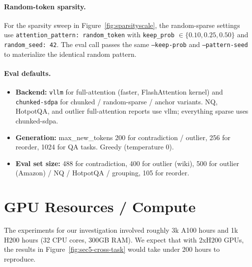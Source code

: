 \paragraph{Random-token sparsity.}
For the sparsity sweep in Figure~\ref{fig:sparsityscale}, the random-sparse settings use \texttt{attention\_pattern: random\_token} with \texttt{keep\_prob} $\in \{0.10, 0.25, 0.50\}$ and \texttt{random\_seed: 42}. The eval call passes the same \texttt{--keep-prob} and \texttt{--pattern-seed} to materialize the identical random pattern.

\paragraph{Eval defaults.}
\begin{itemize}
\item \textbf{Backend:} \texttt{vllm} \cite{kwon2023efficient} for full-attention (faster, FlashAttention \cite{dao2023flashattention2}  kernel) and \texttt{chunked-sdpa} for chunked / random-sparse / anchor variants. NQ, HotpotQA, and outlier full-attention reports use vllm; everything sparse uses chunked-sdpa.
\item \textbf{Generation:} max\_new\_tokens 200 for contradiction / outlier, 256 for reorder, 1024 for QA tasks. Greedy (temperature 0).
\item \textbf{Eval set size:} 488 for contradiction, 400 for outlier (wiki), 500 for outlier (Amazon) / NQ / HotpotQA / grouping, 105 for reorder.
\end{itemize}

\section{GPU Resources / Compute}
\label{app:gpus}

The experiments for our investigation involved roughly 3k A100 hours and 1k H200 hours (32 CPU cores, 300GB RAM). We expect that with 2xH200 GPUs, the results in Figure~\ref{fig:sec5-cross-task} would take under 200 hours to reproduce.


